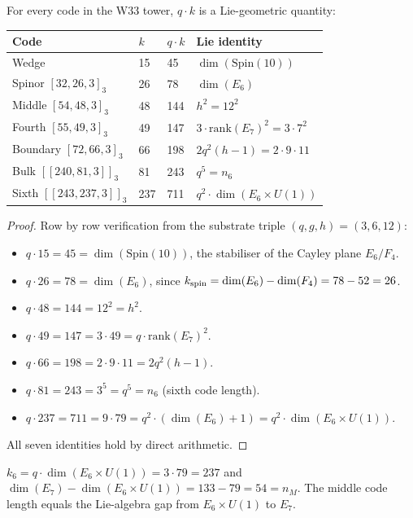 \begin{theorem}\label{thm:qscale}
For every code in the W33 tower, $q\cdot k$ is a Lie-geometric quantity:
\begin{center}
\renewcommand{\arraystretch}{1.3}
\begin{tabular}{llll}
\hline
Code & $k$ & $q\cdot k$ & Lie identity \\
\hline
Wedge & 15 & 45 & $\dim(\mathrm{Spin}(10))$ \\
Spinor $[32,26,3]_3$ & 26 & 78 & $\dim(E_6)$ \\
Middle $[54,48,3]_3$ & 48 & 144 & $h^2 = 12^2$ \\
Fourth $[55,49,3]_3$ & 49 & 147 & $3\cdot\mathrm{rank}(E_7)^2 = 3\cdot 7^2$ \\
Boundary $[72,66,3]_3$ & 66 & 198 & $2q^2(h-1) = 2\cdot 9\cdot 11$ \\
Bulk $[[240,81,3]]_3$ & 81 & 243 & $q^5 = n_6$ \\
Sixth $[[243,237,3]]_3$ & 237 & 711 & $q^2\cdot\dim(E_6\times U(1))$ \\
\hline
\end{tabular}
\end{center}
\end{theorem}

\begin{proof}
Row by row verification from the substrate triple $(q,g,h)=(3,6,12)$:
\begin{itemize}
\item $q\cdot 15 = 45 = \dim(\mathrm{Spin}(10))$, the stabiliser of the Cayley plane $E_6/F_4$.
\item $q\cdot 26 = 78 = \dim(E_6)$, since $k_{\rm spin} = \dim(E_6)-\dim(F_4) = 78-52=26$.
\item $q\cdot 48 = 144 = 12^2 = h^2$.
\item $q\cdot 49 = 147 = 3\cdot 49 = q\cdot\mathrm{rank}(E_7)^2$.
\item $q\cdot 66 = 198 = 2\cdot 9\cdot 11 = 2q^2(h-1)$.
\item $q\cdot 81 = 243 = 3^5 = q^5 = n_6$ (sixth code length).
\item $q\cdot 237 = 711 = 9\cdot 79 = q^2\cdot(\dim(E_6)+1) = q^2\cdot\dim(E_6\times U(1))$.
\end{itemize}
All seven identities hold by direct arithmetic.\end{proof}

\begin{corollary}
$k_6 = q\cdot\dim(E_6\times U(1)) = 3\cdot 79 = 237$
and $\dim(E_7)-\dim(E_6\times U(1)) = 133-79 = 54 = n_M$.
The middle code length equals the Lie-algebra gap from $E_6\times U(1)$ to $E_7$.
\end{corollary}

